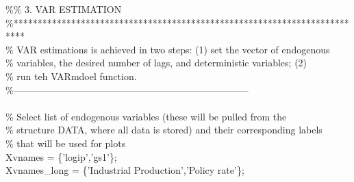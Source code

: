 \hspace{1mm}\hspace{5mm} \textcolor{matlabgreen}{\%}\textcolor{matlabgreen}{\% 3. VAR ESTIMATION }\\ 
\hspace{1mm}\hspace{5mm} \textcolor{matlabgreen}{\%**************************************************************************  }\\ 
\hspace{1mm}\hspace{5mm} \textcolor{matlabgreen}{\% VAR estimations is achieved in two steps: (1) set the vector of endogenous  }\\ 
\hspace{1mm}\hspace{5mm} \textcolor{matlabgreen}{\% variables, the desired number of lags, and deterministic variables; (2) }\\ 
\hspace{1mm}\hspace{5mm} \textcolor{matlabgreen}{\% run teh VARmdoel function. }\\ 
\hspace{1mm}\hspace{5mm} \textcolor{matlabgreen}{\%--------------------------------------------------------------------------  }\\ 
\hspace{1mm}\hspace{5mm}  \\ 
\hspace{1mm}\hspace{5mm} \textcolor{matlabgreen}{\% Select list of endogenous variables (these will be pulled from the  }\\ 
\hspace{1mm}\hspace{5mm} \textcolor{matlabgreen}{\% structure DATA, where all data is stored) and their corresponding labels  }\\ 
\hspace{1mm}\hspace{5mm} \textcolor{matlabgreen}{\% that will be used \textcolor{matlabblue}{for} plots }\\ 
\hspace{1mm}\hspace{5mm} \hspace{5mm} Xvnames      = \{\textcolor{matlabpurple}{'logip'},\textcolor{matlabpurple}{'gs1'}\}; \\ 
\hspace{1mm}\hspace{5mm} \hspace{5mm} Xvnames\_long = \{\textcolor{matlabpurple}{'Industrial Production'},\textcolor{matlabpurple}{'Policy rate'}\}; \\ 
